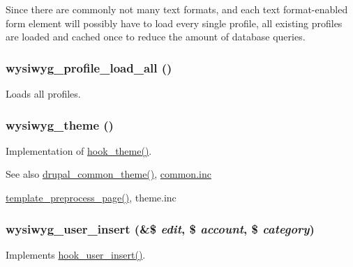 Since there are commonly not many text formats, and each text format-\/enabled form element will possibly have to load every single profile, all existing profiles are loaded and cached once to reduce the amount of database queries. \hypertarget{wysiwyg_8module_aa23a280b799f030dee20a62248ec4673}{
\subsubsection[{wysiwyg\_\-profile\_\-load\_\-all}]{\setlength{\rightskip}{0pt plus 5cm}wysiwyg\_\-profile\_\-load\_\-all ()}}
\label{wysiwyg_8module_aa23a280b799f030dee20a62248ec4673}
Loads all profiles. \hypertarget{wysiwyg_8module_a03b61c521946527bba7ecee753da3256}{
\subsubsection[{wysiwyg\_\-theme}]{\setlength{\rightskip}{0pt plus 5cm}wysiwyg\_\-theme ()}}
\label{wysiwyg_8module_a03b61c521946527bba7ecee753da3256}
Implementation of \hyperlink{group__hooks_ga013ccb45c7aaab1c16cf9691428c910d}{hook\_\-theme()}.

\begin{DoxySeeAlso}{See also}
\hyperlink{common_8inc_a1263ef82e0da5b85f8203783ed164872}{drupal\_\-common\_\-theme()}, \hyperlink{common_8inc}{common.inc} 

\hyperlink{includes_2theme_8inc_a128dae24f990d8ba4710ac78b0584c11}{template\_\-preprocess\_\-page()}, theme.inc 
\end{DoxySeeAlso}
\hypertarget{wysiwyg_8module_aa4b0ba2dca5e44102fb46134747fc6a8}{
\subsubsection[{wysiwyg\_\-user\_\-insert}]{\setlength{\rightskip}{0pt plus 5cm}wysiwyg\_\-user\_\-insert (\&\$ {\em edit}, \/  \$ {\em account}, \/  \$ {\em category})}}
\label{wysiwyg_8module_aa4b0ba2dca5e44102fb46134747fc6a8}
Implements \hyperlink{group__hooks_gaa3e2c4c972ee796d216b15da7aaf9c2c}{hook\_\-user\_\-insert()}.

